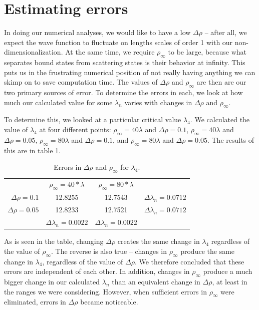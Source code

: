 \documentclass[12pt,twoside]{reedthesis}
\begin{document}
\section{Estimating errors}
In doing our numerical analyses, we would like to have a low $\Delta \rho$ -- after all, we expect the wave function to fluctuate on lengths scales of order 1 with our non-dimensionalization. At the same time, we require $\rho_{\infty}$ to be large, because what separates bound states from scattering states is their behavior at infinity. This puts us in the frustrating numerical position of not really having anything we can skimp on to save computation time. The values of $\Delta \rho$ and $\rho_\infty$ are then are our two primary sources of error. To determine the errors in each, we look at how much our calculated value for some $\lambda_{n}$ varies with changes in $\Delta \rho$ and $\rho_{\infty}$.  

To determine this, we looked at a particular critical value $\lambda_{4}$. We calculated the value of $\lambda_{4}$ at four different points: $\rho_{\infty} = 40\lambda$ and $\Delta \rho = 0.1$, $\rho_{\infty} = 40\lambda$ and $\Delta \rho = 0.05$, $\rho_{\infty} = 80\lambda$ and $\Delta \rho = 0.1$, and $\rho_{\infty} = 80\lambda$ and $\Delta \rho = 0.05$. The results of this are in table \ref{tab:errorchanges}. 
\begin{table}
\centering
\begin{tabular}{r|c|c|c|}
\multicolumn{1}{r}{}
 &  \multicolumn{1}{c}{$\rho_{\infty} = 40*\lambda$}
 & \multicolumn{1}{c}{$\rho_{\infty} = 80*\lambda$}
 & \multicolumn{1}{l}{} \\
\cline{2-4}
$\Delta \rho = 0.1$ & 12.8255 & 12.7543 & $\Delta \lambda_n = 0.0712$\\
\cline{2-4}
$\Delta \rho = 0.05$ & 12.8233 & 12.7521& $\Delta \lambda_n = 0.0712$ \\
\cline{2-4}
\multicolumn{1}{r}{}
 &  \multicolumn{1}{|c|}{$\Delta \lambda_n = 0.0022$}
 & \multicolumn{1}{c|}{$\Delta \lambda_n = 0.0022$}
 & \multicolumn{1}{l}{} \\
 \cline{2-3}
\end{tabular}
\caption{Errors in $\Delta \rho$ and $\rho_{\infty}$ for $\lambda_4$.}
\label{tab:errorchanges}
\end{table}
As is seen in the table, changing $\Delta \rho$ creates the same change in $\lambda_4$ regardless of the value of $\rho_{\infty}$. The reverse is also true -- changes in $\rho_{\infty}$ produce the same change in $\lambda_4$, regardless of the value of $\Delta \rho$. We therefore concluded that these errors are independent of each other. In addition, changes in $\rho_{\infty}$ produce a much bigger change in our calculated $\lambda_{n}$ than an equivalent change in $\Delta \rho$, at least in the ranges we were considering. However, when sufficient errors in $\rho_{\infty}$ were eliminated, errors in $\Delta \rho$ became noticeable.
 
\end{document}
